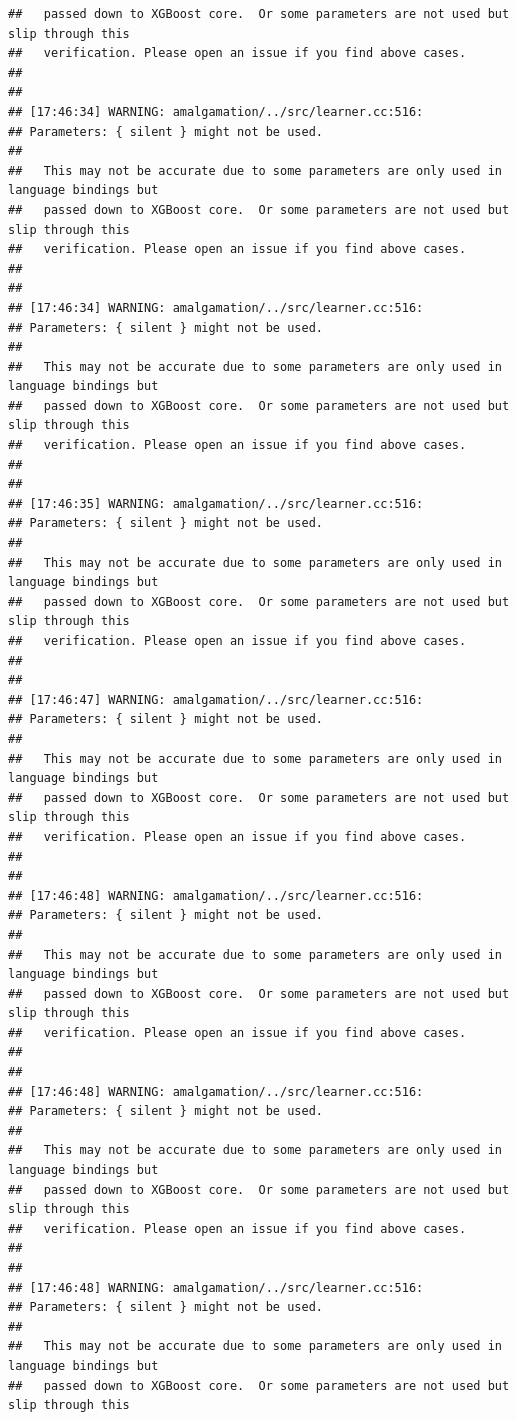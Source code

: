 \documentclass[AMS,STIX2COL]{WileyNJD-v2}\usepackage[]{graphicx}\usepackage[]{color}
\makeatletter
\newenvironment{kframe}{%
 \def\at@end@of@kframe{}%
 \ifinner\ifhmode%
  \def\at@end@of@kframe{\end{minipage}}%
  \begin{minipage}{\columnwidth}%
 \fi\fi%
 \def\FrameCommand##1{\hskip\@totalleftmargin \hskip-\fboxsep
 \colorbox{shadecolor}{##1}\hskip-\fboxsep
     \hskip-\linewidth \hskip-\@totalleftmargin \hskip\columnwidth}%
 \MakeFramed {\advance\hsize-\width
   \@totalleftmargin\z@ \linewidth\hsize
   \@setminipage}}%
 {\par\unskip\endMakeFramed%
 \at@end@of@kframe}
\newenvironment{knitrout}{}{} %
\makeatother
\begin{document}
\begin{knitrout}
\begin{kframe}
\begin{verbatim}
##   passed down to XGBoost core.  Or some parameters are not used but slip through this
##   verification. Please open an issue if you find above cases.
## 
## 
## [17:46:34] WARNING: amalgamation/../src/learner.cc:516: 
## Parameters: { silent } might not be used.
## 
##   This may not be accurate due to some parameters are only used in language bindings but
##   passed down to XGBoost core.  Or some parameters are not used but slip through this
##   verification. Please open an issue if you find above cases.
## 
## 
## [17:46:34] WARNING: amalgamation/../src/learner.cc:516: 
## Parameters: { silent } might not be used.
## 
##   This may not be accurate due to some parameters are only used in language bindings but
##   passed down to XGBoost core.  Or some parameters are not used but slip through this
##   verification. Please open an issue if you find above cases.
## 
## 
## [17:46:35] WARNING: amalgamation/../src/learner.cc:516: 
## Parameters: { silent } might not be used.
## 
##   This may not be accurate due to some parameters are only used in language bindings but
##   passed down to XGBoost core.  Or some parameters are not used but slip through this
##   verification. Please open an issue if you find above cases.
## 
## 
## [17:46:47] WARNING: amalgamation/../src/learner.cc:516: 
## Parameters: { silent } might not be used.
## 
##   This may not be accurate due to some parameters are only used in language bindings but
##   passed down to XGBoost core.  Or some parameters are not used but slip through this
##   verification. Please open an issue if you find above cases.
## 
## 
## [17:46:48] WARNING: amalgamation/../src/learner.cc:516: 
## Parameters: { silent } might not be used.
## 
##   This may not be accurate due to some parameters are only used in language bindings but
##   passed down to XGBoost core.  Or some parameters are not used but slip through this
##   verification. Please open an issue if you find above cases.
## 
## 
## [17:46:48] WARNING: amalgamation/../src/learner.cc:516: 
## Parameters: { silent } might not be used.
## 
##   This may not be accurate due to some parameters are only used in language bindings but
##   passed down to XGBoost core.  Or some parameters are not used but slip through this
##   verification. Please open an issue if you find above cases.
## 
## 
## [17:46:48] WARNING: amalgamation/../src/learner.cc:516: 
## Parameters: { silent } might not be used.
## 
##   This may not be accurate due to some parameters are only used in language bindings but
##   passed down to XGBoost core.  Or some parameters are not used but slip through this

\end{verbatim}
\end{kframe}
\end{knitrout}
\end{document}
